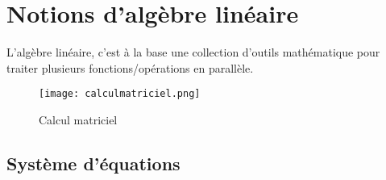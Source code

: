 \chapter{Notions d'algèbre linéaire}

L'algèbre linéaire, c'est à la base une collection d'outils mathématique pour traiter plusieurs fonctions/opérations en parallèle. 

\begin{figure}[htbp]
	\centering
		\texttt{[image: calculmatriciel.png]}
	\caption{Calcul matriciel }
	\label{fig:calculmatriciel}
\end{figure}


\newpage
\section{Système d’équations}
\label{sec:syseq}

